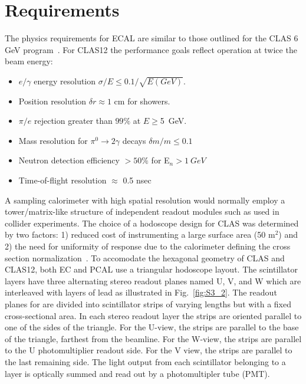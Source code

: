 \section{Requirements}

The physics requirements for ECAL are similar to those outlined for the CLAS 6 GeV program~\cite{clas6nim}.  For CLAS12 the performance goals reflect operation at twice the beam energy:

\begin{itemize}
\item $e/\gamma$ energy resolution $\sigma/E \le 0.1/\sqrt{E(GeV)}$.  
\item Position resolution $\delta r\approx 1$ cm for showers.
\item $\pi/e$ rejection greater than $99\%$ at $E\ge$5~GeV.
\item Mass resolution for $\pi^0\rightarrow 2\gamma$ decays $\delta m/m \le 0.1$
\item Neutron detection efficiency $>50\%$ for E$_n>1~GeV$
\item Time-of-flight resolution $\approx$ 0.5 nsec
\end{itemize}

A sampling calorimeter with high spatial resolution would normally employ a tower/matrix-like structure of independent readout modules such as used in collider experiments.  The choice of a hodoscope design for CLAS was determined by two factors: 1) reduced cost of instrumenting a large surface area (50 m$^2$) and 2) the need for uniformity of response due to the calorimeter defining the cross section normalization~\cite{1990014}.  To accomodate the hexagonal geometry of CLAS and CLAS12, both EC and PCAL use a triangular hodoscope layout.  The scintillator layers have three alternating stereo readout planes named U, V, and W which are interleaved
with layers of lead as illustrated in Fig.~\ref{fig:S3_2}. The readout planes for are divided into scintillator strips
of varying lengths but with a fixed cross-sectional area. In each stereo readout layer
the strips are oriented parallel to one of the sides of the triangle. For the U-view, the
strips are parallel to the base of the triangle, farthest from the beamline. For the W-view, the strips are parallel
to the U photomultiplier readout side. For the V view, the strips are parallel to the last remaining side.  The light output from each scintillator belonging to a layer is optically summed and read out by a photomultipler tube (PMT).


